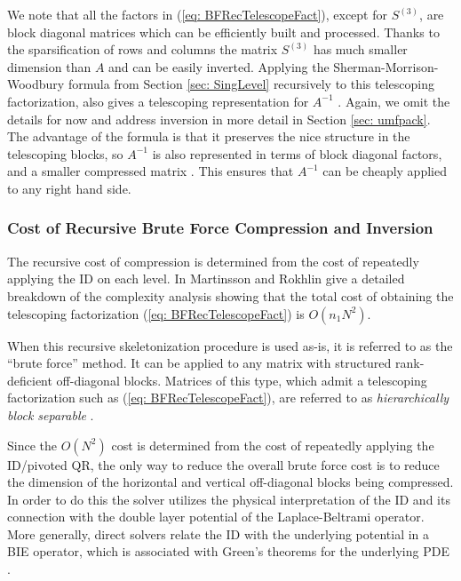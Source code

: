 \documentclass{sfuthesis}
\begin{document}
We note that all the factors in (\ref{eq: BFRecTelescopeFact}), except for $S^{(3)}$, are block diagonal matrices which can be efficiently built and processed. Thanks to the sparsification of rows and columns the matrix $S^{(3)}$ has much smaller dimension than $A$ and can be easily inverted. Applying the Sherman-Morrison-Woodbury formula from Section \ref{sec: SingLevel} recursively to this telescoping factorization, also gives a telescoping representation for $A^{-1}$ \cite{GillYoungMart2012}. Again, we omit the details for now and address inversion in more detail in Section \ref{sec: umfpack}. The advantage of the formula is that it preserves the nice structure in the telescoping blocks, so $A^{-1}$ is also represented in terms of block diagonal factors, and a smaller compressed matrix \cite{GillYoungMart2012}.  This ensures that $A^{-1}$ can be cheaply applied to any right hand side.

\subsubsection{Cost of Recursive Brute Force Compression and Inversion}
The recursive cost of compression is determined from the cost of repeatedly applying the ID on each level. In \cite{MartRokh2005} Martinsson and Rokhlin give a detailed breakdown of the complexity analysis showing that the total cost of obtaining the telescoping factorization (\ref{eq: BFRecTelescopeFact}) is $O(n_1N^2)$. 

When this recursive skeletonization procedure is used as-is, it is referred to as the \enquote{brute force} method. It can be applied to any matrix with structured rank-deficient off-diagonal blocks. Matrices of this type, which admit a telescoping factorization such as (\ref{eq: BFRecTelescopeFact}), are referred to as \textit{hierarchically block separable} \cite{GillYoungMart2012}. 

Since the $O(N^2)$ cost is determined from the cost of repeatedly applying the ID/pivoted QR, the only way to reduce the overall brute force cost is to reduce the dimension of the horizontal and vertical off-diagonal blocks being compressed. In order to do this the solver utilizes the physical interpretation of the ID and its connection with the double layer potential of the Laplace-Beltrami operator. More generally, direct solvers relate the ID with the underlying potential in a BIE operator, which is associated with Green's theorems for the underlying PDE \cite{HoGreen2012, MartRokh2005, GillYoungMart2012}.
\end{document}

